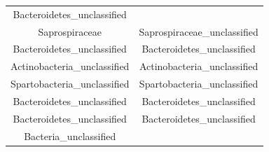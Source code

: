 \documentclass[]{article}
\begin{document}
\begin{longtable}[]{@{}cc@{}}
\begin{minipage}[t]{0.46\columnwidth}
Bacteroidetes\_unclassified\strut
\end{minipage}\tabularnewline
\begin{minipage}[t]{0.46\columnwidth}\centering\strut
Saprospiraceae\strut
\end{minipage} & \begin{minipage}[t]{0.46\columnwidth}\centering\strut
Saprospiraceae\_unclassified\strut
\end{minipage}\tabularnewline
\begin{minipage}[t]{0.46\columnwidth}\centering\strut
Bacteroidetes\_unclassified\strut
\end{minipage} & \begin{minipage}[t]{0.46\columnwidth}\centering\strut
Bacteroidetes\_unclassified\strut
\end{minipage}\tabularnewline
\begin{minipage}[t]{0.46\columnwidth}\centering\strut
Actinobacteria\_unclassified\strut
\end{minipage} & \begin{minipage}[t]{0.46\columnwidth}\centering\strut
Actinobacteria\_unclassified\strut
\end{minipage}\tabularnewline
\begin{minipage}[t]{0.46\columnwidth}\centering\strut
Spartobacteria\_unclassified\strut
\end{minipage} & \begin{minipage}[t]{0.46\columnwidth}\centering\strut
Spartobacteria\_unclassified\strut
\end{minipage}\tabularnewline
\begin{minipage}[t]{0.46\columnwidth}\centering\strut
Bacteroidetes\_unclassified\strut
\end{minipage} & \begin{minipage}[t]{0.46\columnwidth}\centering\strut
Bacteroidetes\_unclassified\strut
\end{minipage}\tabularnewline
\begin{minipage}[t]{0.46\columnwidth}\centering\strut
Bacteroidetes\_unclassified\strut
\end{minipage} & \begin{minipage}[t]{0.46\columnwidth}\centering\strut
Bacteroidetes\_unclassified\strut
\end{minipage}\tabularnewline
\begin{minipage}[t]{0.46\columnwidth}\centering\strut
Bacteria\_unclassified\strut
\end{minipage} & \begin{minipage}[t]{0.46\columnwidth}\centering\strut

\end{minipage}
\end{longtable}
\end{document}
